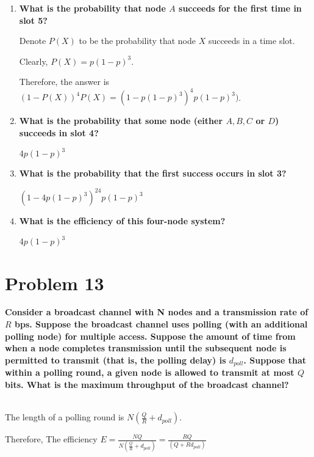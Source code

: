 \documentclass[11pt]{article}
\newenvironment{qparts}{\begin{enumerate}[{(}a{)}]}{\end{enumerate}}
\begin{document}
\begin{qparts}

	\item \textbf{What is the probability that node $A$ succeeds for the first time in slot 5?}
	
	Denote $P(X)$ to be the probability that node $X$ succeeds in a time slot.
	
	Clearly,  $P(X) = p(1-p)^3$.
	
	Therefore, the answer is $(1-P(X))^4P(X) = (1 - p(1-p)^3)^4p(1-p)^3)$.
	
	\item \textbf{What is the probability that some node (either $A, B, C$ or $D$) succeeds in slot 4?}
	
	$4p(1-p)^3$

	\item \textbf{What is the probability that the first success occurs in slot 3?}
	
	$(1-4p(1-p)^3)^24p(1-p)^3$

	\item \textbf{What is the efficiency of this four-node system?}
	
	$4p(1-p)^3$

\end{qparts}


\newpage
\section{Problem 13}

\textbf{Consider a broadcast channel with N nodes and a transmission rate of $R$ bps. Suppose the broadcast channel uses polling (with an additional polling node) for multiple access. Suppose the amount of time from when a node completes transmission until the subsequent node is permitted to transmit (that is, the polling delay) is $d_{poll}$. Suppose that within a polling round, a given node is allowed to transmit at most $Q$ bits. What is the maximum throughput of the broadcast channel?}


~\\

The length of a polling round is $N(\frac{Q}{R} + d_{poll})$.

Therefore, The efficiency $E =\frac{NQ}{N(\frac{Q}{R} + d_{poll})} =  \frac{RQ}{(Q + Rd_{poll})}$
\end{document}
